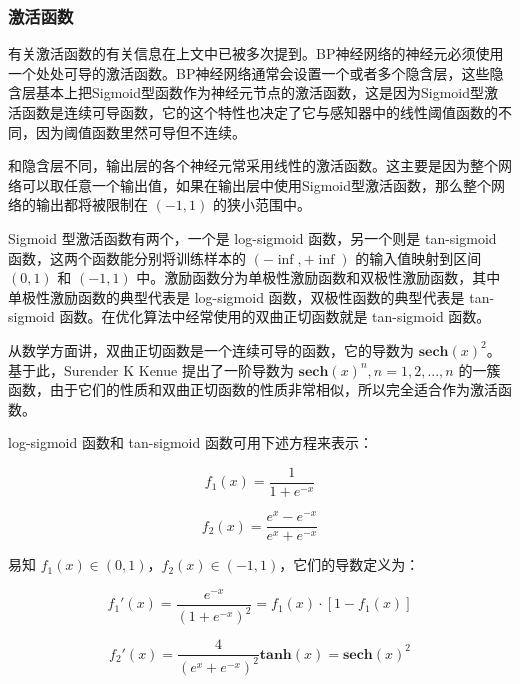 \documentclass[UTF8]{ctexart}
\begin{document}
\subsubsection{激活函数}

有关激活函数的有关信息在上文中已被多次提到。BP神经网络的神经元必须使用一个处处可导的激活函数。BP神经网络通常会设置一个或者多个隐含层，这些隐含层基本上把Sigmoid型函数作为神经元节点的激活函数，这是因为Sigmoid型激活函数是连续可导函数，它的这个特性也决定了它与感知器中的线性阈值函数的不同，因为阈值函数里然可导但不连续。 \par

和隐含层不同，输出层的各个神经元常采用线性的激活函数。这主要是因为整个网络可以取任意一个输出值，如果在输出层中使用Sigmoid型激活函数，那么整个网络的输出都将被限制在 $(-1,1)$ 的狭小范围中。 \par

Sigmoid 型激活函数有两个，一个是 log-sigmoid 函数，另一个则是 tan-sigmoid 函数，这两个函数能分别将训练样本的 $(-\inf, + \inf)$ 的输入值映射到区间 $(0,1)$ 和 $(-1,1)$ 中。激励函数分为单极性激励函数和双极性激励函数，其中单极性激励函数的典型代表是 log-sigmoid 函数，双极性函数的典型代表是 tan-sigmoid 函数。在优化算法中经常使用的双曲正切函数就是 tan-sigmoid 函数。 \par
从数学方面讲，双曲正切函数是一个连续可导的函数，它的导数为 $\mathbf{sech}(x)^2$。基于此，Surender K Kenue 提出了一阶导数为 $\mathbf{sech}(x)^n, n=1,2,...,n$ 的一簇函数，由于它们的性质和双曲正切函数的性质非常相似，所以完全适合作为激活函数。 \par

log-sigmoid 函数和 tan-sigmoid 函数可用下述方程来表示： \par


\begin{equation}
f_1(x)=\frac{1}{1+e^{-x}}
\end{equation}

\begin{equation}
f_2(x)=\frac{e^x-e^{-x}}{e^x+e^{-x}}
\end{equation}

易知 $f_1(x) \in (0,1)$，$f_2(x) \in (-1,1)$，它们的导数定义为：

\begin{equation}
f_1'(x)=\frac{e^{-x}}{(1+e^{-x})^2} = f_1(x) \cdot [1-f_1(x)]
\end{equation}

\begin{equation}
f_2'(x)= \frac{4}{(e^x+e^{-x})^2} \mathbf{tanh}(x) = \mathbf{sech}(x)^2
\end{equation}
\end{document}
